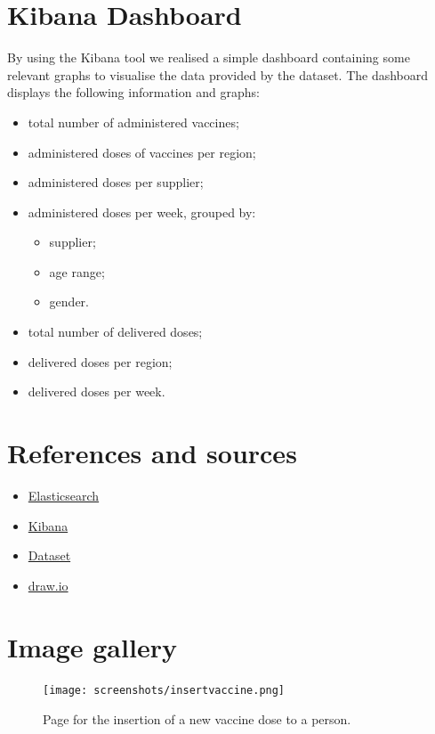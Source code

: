 \documentclass{article}
\begin{document}
\section{Kibana Dashboard}
By using the Kibana tool we realised a simple dashboard containing some relevant graphs to visualise the data provided by the dataset.
The dashboard displays the following information and graphs:
\begin{itemize}
    \item total number of administered vaccines;
    \item administered doses of vaccines per region;
    \item administered doses per supplier;
    \item administered doses per week, grouped by:
    \begin{itemize}
        \item supplier;
        \item age range;
        \item gender.
    \end{itemize}
    \item total number of delivered doses;
    \item delivered doses per region;
    \item delivered doses per week.
\end{itemize}



\section{References and sources}
\begin{itemize}
    \item \href{https://www.elastic.co}{Elasticsearch}
    \item \href{https://www.elastic.co/kibana/}{Kibana}
    \item \href{https://github.com/italia/covid19-opendata-vaccini}{Dataset}
    \item \href{https://app.diagrams.net}{draw.io}
\end{itemize}


\section{Image gallery}


\begin{figure}[ht!]
    \centering
    \texttt{[image: screenshots/insertvaccine.png]}
    \caption{Page for the insertion of a new vaccine dose to a person.}
\end{figure}
\end{document}
